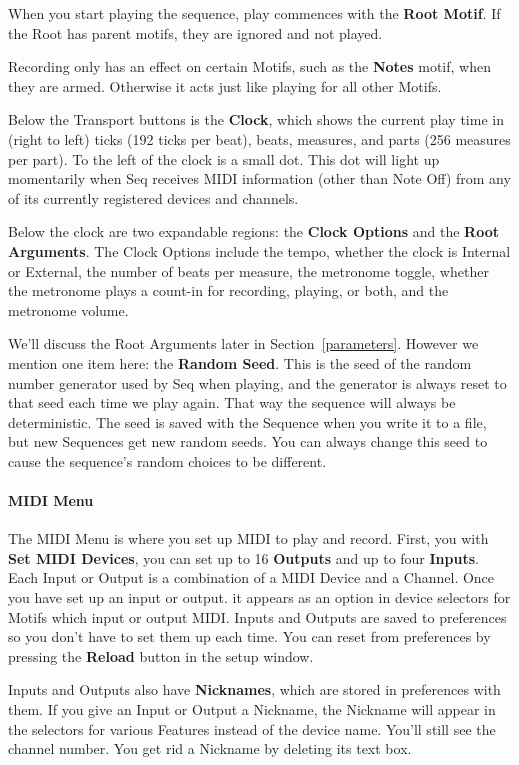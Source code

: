 \documentclass[twoside,10pt]{article}
\begin{document}
When you start playing the sequence, play commences with the {\bf Root Motif}.  If the Root has parent motifs, they are ignored and not played.  

Recording only has an effect on certain Motifs, such as the {\bf Notes} motif, when they are armed.  Otherwise it acts just like playing for all other Motifs.

Below the Transport buttons is the {\bf Clock}, which shows the current play time in (right to left) ticks (192 ticks per beat), beats, measures, and parts (256 measures per part).  To the left of the clock is a small dot.  This dot will light up momentarily when Seq receives MIDI information (other than Note Off) from any of its currently registered devices and channels.

Below the clock are two expandable regions: the {\bf Clock Options} and the {\bf Root Arguments}.  The Clock Options include the tempo, whether the clock is Internal or External, the number of beats per measure, the metronome toggle, whether the metronome plays a count-in for recording, playing, or both, and the metronome volume.

We'll discuss the Root Arguments later in Section~\ref{parameters}.  However we mention one item here: the {\bf Random Seed}.  This is the seed of the random number generator used by Seq when playing, and the generator is always reset to that seed each time we play again.  That way the sequence will always be deterministic.  The seed is saved with the Sequence when you write it to a file, but new Sequences get new random seeds. You can always change this seed to cause the sequence's random choices to be different.

\paragraph{MIDI Menu}

The MIDI Menu is where you set up MIDI to play and record.  First, you with {\bf Set MIDI Devices}, you can set up to 16 {\bf Outputs} and up to four {\bf Inputs}.  Each Input or Output is a combination of a MIDI Device and a Channel.  Once you have set up an input or output. it appears as an option in device selectors for Motifs which input or output MIDI.  Inputs and Outputs are saved to preferences so you don't have to set them up each time.  You can reset from preferences by pressing the {\bf Reload} button in the setup window.

Inputs and Outputs also have {\bf Nicknames}, which are stored in preferences with them.  If you give an Input or Output a Nickname, the Nickname will appear in the selectors for various Features instead of the device name.  You'll still see the channel number.  You get rid a Nickname by deleting its text box.
\end{document}
